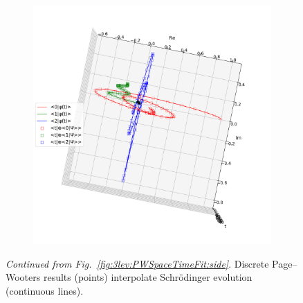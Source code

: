 \begin{figure}[p]\ContinuedFloat %
  \begin{fullpage}
    \begin{subfigure}{\textwidth}
      \includegraphics[width=\textwidth]{img/3ldetect/PWSpaceTimeFit_top.pdf}
      \label{fig:3lev:PWSpaceTimeFit:top}
    \end{subfigure}
    \caption{
      \textit{Continued from Fig.~\ref{fig:3lev:PWSpaceTimeFit:side}}.
      Discrete Page--Wooters results (points)
      interpolate
      Schr\"{o}dinger
      evolution (continuous lines).
    }
  \end{fullpage}
\end{figure}


